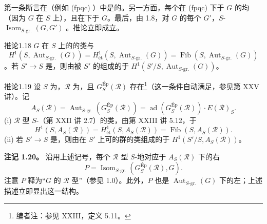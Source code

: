 第一条断言在（例如 (fpqc) ）中是的。另一方面，每个在 (fpqc) 下于 $G$ 的均（因为 $G$ 在 $S$ 上），且在下于 $G$。最后，由 1.8，对 $G$ 的每个 $G'$，$S$- $\operatorname{Isom}_{S\text{-gr.}}(G,G')$ 。推论立即成立。
\begin{SGAresult}{推论}{1.18}
 $G$ 在 $S$ 上的的类与
\[H^1(S,\operatorname{Aut}_{S\text{-gr.}}(G))=H^1_{\text{ét}}(S,\operatorname{Aut}_{S\text{-gr.}}(G))=\operatorname{Fib}(S,\operatorname{Aut}_{S\text{-gr.}}(G))\]
。若 $S'\to S$ 是，则由被 $S'$ 的组成的于 $H^1(S'/S,\operatorname{Aut}_{S\text{-gr.}}(G))$。
\end{SGAresult}
\begin{SGAresult}{推论}{1.19}
设 $S$ 为，$\mathcal R$ 为，且 $G^{\mathrm{Ép}}_S(\mathcal R)$ 存在\footnote[10]{编者注：参见 XXIII，定义 5.11。}（这一条件自动满足，参见第 XXV 讲）。记
\[A_S(\mathcal R)=\operatorname{Aut}_{S\text{-gr.}}(G^{\mathrm{Ép}}_S(\mathcal R))=\operatorname{ad}(G^{\mathrm{Ép}}_S(\mathcal R))\cdot E(\mathcal R)_S.\]
(i) $\mathcal R$ 型 $S$-（第 XXII 讲 2.7）的类，由第 XXIII 讲 5.12，于
\[H^1(S,A_S(\mathcal R))=H^1_{\text{ét}}(S,A_S(\mathcal R))=\operatorname{Fib}(S,A_S(\mathcal R)).\]
(ii) 若 $S'\to S$ 是，则由在 $S'$ 上可的群的类组成的于 $H^1(S'/S,A_S(\mathcal R))$。
\end{SGAresult}
\textbf{注记 1.20。} 沿用上述记号，每个 $\mathcal R$ 型 $S$-地对应于 $A_S(\mathcal R)$ 下的右
\[P=\operatorname{Isom}_{S\text{-gr.}}(G^{\mathrm{Ép}}_S(\mathcal R),G).\]
注意 $P$ 释为“$G$ 的 $\mathcal R$ 型”（参见 1.0）。此外，$P$ 也是 $\operatorname{Aut}_{S\text{-gr.}}(G)$ 下的左；上述描述立即显出这一结构。
